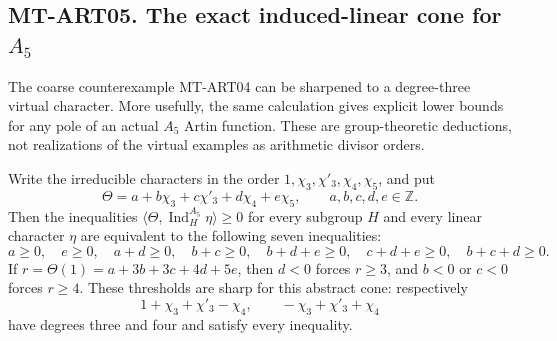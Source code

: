 \subsection*{MT-ART05. The exact induced-linear cone for \texorpdfstring{$A_5$}{A5}}
The coarse counterexample MT-ART04 can be sharpened to a degree-three
virtual character. More usefully, the same calculation gives explicit
lower bounds for any pole of an actual $A_5$ Artin function. These are
group-theoretic deductions, not realizations of the virtual examples as
arithmetic divisor orders.

Write the irreducible characters in the order
$1,\chi_3,\chi'_3,\chi_4,\chi_5$, and put
\[
 \Theta=a+b\chi_3+c\chi'_3+d\chi_4+e\chi_5,
 \qquad a,b,c,d,e\in\mathbb Z.
\]
Then the inequalities
$\langle\Theta,\operatorname{Ind}_H^{A_5}\eta\rangle\ge0$ for
every subgroup $H$ and every linear character $\eta$ are equivalent to
the following seven inequalities:
\[
 a\ge0,\quad e\ge0,\quad a+d\ge0,\quad b+c\ge0,\quad
 b+d+e\ge0,\quad c+d+e\ge0,\quad b+c+d\ge0.       \tag{MT-A5-cone}
\]
If $r=\Theta(1)=a+3b+3c+4d+5e$, then $d<0$ forces $r\ge3$,
and $b<0$ or $c<0$ forces $r\ge4$. These thresholds are sharp for
this abstract cone: respectively
\[
       1+\chi_3+\chi'_3-\chi_4,
       \qquad -\chi_3+\chi'_3+\chi_4               \tag{MT-A5-ex}
\]
have degrees three and four and satisfy every inequality.

